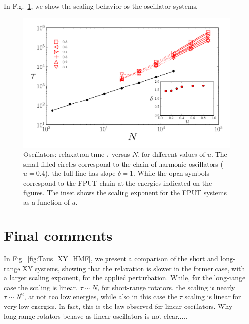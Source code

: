 \documentclass[aps,pre,showpacs,twocolumn,superscriptaddress,floatfix]{revtex4-1}
\begin{document}
{In Fig.~\ref{fig:tau_FPU_HC}, we show the scaling behavior os the oscillator systems.

\begin{figure}[h]
 \centering
 \includegraphics[width=1.0\linewidth]{./tau_FPU_HC.pdf}
 \caption{Oscillators: relaxation time $\tau$ versus $N$,  for different values of $u$. 
The small filled circles correspond to the chain of harmonic oscillators ($u=0.4$), 
the full line has slope $\delta=1$.
While the open symbols correspond to the FPUT chain at the energies indicated on the figures. 
The inset shows the scaling exponent for the FPUT systems as a function of $u$. 
}
 \label{fig:tau_FPU_HC}
\end{figure}











\section{Final comments}

In Fig.~\ref{fig:Taus_XY_HMF}, we present a comparison of the short and long-range XY systems, 
 showing that the relaxation is slower in the former case, with a larger scaling exponent, 
for the applied perturbation. 
While, for the long-range case the scaling is linear, $\tau \sim N$, 
for short-range rotators, the scaling is nearly $\tau \sim N^2$, at not too low energies, 
while also in this case the $\tau$ scaling is linear for very low energies. 
In fact, this  is the law observed for linear oscillators. 
Why long-range rotators behave as linear oscillators is not clear.....

}
\end{document}
